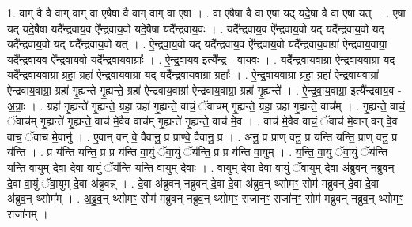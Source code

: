 \documentclass[17pt]{extarticle}
\begin{document}
1. वाग् वै वै वाग् वाग् वा ए॒षैषा वै वाग् वाग् वा ए॒षा । . वा ए॒षैषा वै वा ए॒षा यद् यदे॒षा वै वा ए॒षा यत् । . ए॒षा यद् यदे॒षैषा यदै᳚न्द्रवाय॒व ऐ᳚न्द्रवाय॒वो यदे॒षैषा यदै᳚न्द्रवाय॒वः । . यदै᳚न्द्रवाय॒व ऐ᳚न्द्रवाय॒वो यद् यदै᳚न्द्रवाय॒वो यद् यदै᳚न्द्रवाय॒वो यद् यदै᳚न्द्रवाय॒वो यत् । . ऐ॒न्द्र॒वा॒य॒वो यद् यदै᳚न्द्रवाय॒व ऐ᳚न्द्रवाय॒वो यदै᳚न्द्रवाय॒वाग्रा॑ ऐन्द्रवाय॒वाग्रा॒ 
यदै᳚न्द्रवाय॒व ऐ᳚न्द्रवाय॒वो यदै᳚न्द्रवाय॒वाग्राः᳚ । . ऐ॒न्द्र॒वा॒य॒व इत्यै᳚न्द्र - वा॒य॒वः । . यदै᳚न्द्रवाय॒वाग्रा॑ ऐन्द्रवाय॒वाग्रा॒ यद् यदै᳚न्द्रवाय॒वाग्रा॒ ग्रहा॒ ग्रहा॑ ऐन्द्रवाय॒वाग्रा॒ यद् यदै᳚न्द्रवाय॒वाग्रा॒ ग्रहाः᳚ । . ऐ॒न्द्र॒वा॒य॒वाग्रा॒ ग्रहा॒ ग्रहा॑ ऐन्द्रवाय॒वाग्रा॑ ऐन्द्रवाय॒वाग्रा॒ ग्रहा॑ गृ॒ह्यन्ते॑ गृ॒ह्यन्ते॒ ग्रहा॑ ऐन्द्रवाय॒वाग्रा॑ ऐन्द्रवाय॒वाग्रा॒ ग्रहा॑ गृ॒ह्यन्ते᳚ । . ऐ॒न्द्र॒वा॒य॒वाग्रा॒ इत्यै᳚न्द्रवाय॒व - अ॒ग्राः॒ । . ग्रहा॑ गृ॒ह्यन्ते॑ गृ॒ह्यन्ते॒ ग्रहा॒ ग्रहा॑ गृ॒ह्यन्ते॒ वाचं॒ ॅवाच॑म् गृ॒ह्यन्ते॒ ग्रहा॒ ग्रहा॑ गृ॒ह्यन्ते॒ वाच᳚म् । . गृ॒ह्यन्ते॒ वाचं॒ ॅवाच॑म् गृ॒ह्यन्ते॑ गृ॒ह्यन्ते॒ वाच॑ मे॒वैव वाच॑म् गृ॒ह्यन्ते॑ गृ॒ह्यन्ते॒ वाच॑ मे॒व । . वाच॑ मे॒वैव वाचं॒ ॅवाच॑ मे॒वान् वन् वे॒व वाचं॒ ॅवाच॑ मे॒वानु॑ । . ए॒वान् वन् वे॒ वैवानु॒ प्र प्राण्वे॒ वैवानु॒ प्र । . अनु॒ प्र प्राण् वनु॒ प्र य॑न्ति यन्ति॒ प्राण् वनु॒ प्र य॑न्ति । . प्र य॑न्ति यन्ति॒ प्र प्र य॑न्ति वा॒युं ॅवा॒युं ॅय॑न्ति॒ प्र प्र य॑न्ति वा॒युम् । . य॒न्ति॒ वा॒युं ॅवा॒युं ॅय॑न्ति यन्ति वा॒युम् दे॒वा दे॒वा वा॒युं ॅय॑न्ति यन्ति वा॒युम् दे॒वाः । . वा॒युम् दे॒वा दे॒वा वा॒युं ॅवा॒युम् दे॒वा अ॑ब्रुवन् नब्रुवन् दे॒वा वा॒युं ॅवा॒युम् दे॒वा अ॑ब्रुवन्न् । . दे॒वा अ॑ब्रुवन् नब्रुवन् दे॒वा दे॒वा अ॑ब्रुव॒न् थ्सोमꣳ॒॒ सोम॑ मब्रुवन् दे॒वा दे॒वा अ॑ब्रुव॒न् थ्सोम᳚म् । . अ॒ब्रु॒व॒न् थ्सोमꣳ॒॒ सोम॑ मब्रुवन् नब्रुव॒न् थ्सोमꣳ॒॒ राजा॑नꣳ॒॒ राजा॑नꣳ॒॒ सोम॑ मब्रुवन् नब्रुव॒न् थ्सोमꣳ॒॒ राजा॑नम् । \newline
\end{document}
